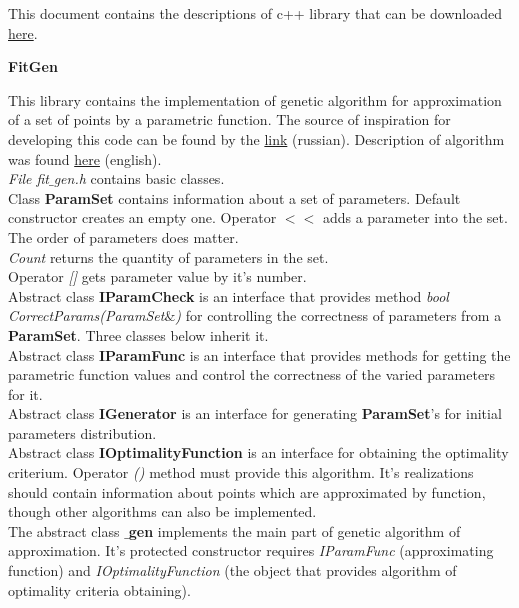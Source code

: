 \documentclass[a4paper]{article}
\begin{document}
This document contains the descriptions of c++ library that can be downloaded
\href{https://github.com/alexkernphysiker/FitGen}{here}.
\\
\begin{center}\Large \textbf{FitGen}\end{center}
This library contains the implementation of genetic algorithm for approximation of a set of points by a parametric function. 
The source of inspiration for developing this code can be found by the \href{http://habrahabr.ru/post/171751/}{link} (russian). 
Description of algorithm was found \href{http://www.drdobbs.com/database/differential-evolution/184410166}{here} (english).
\\
\textit{\Large File fit$\_$gen.h} contains basic classes.
\\
Class \textbf{ParamSet} contains information about a set of parameters. 
Default constructor creates an empty one.
Operator \textit{$<<$} adds a parameter into the set. The order of parameters does matter.\\
\textit{Count} returns the quantity of parameters in the set.\\
Operator \textit{[]} gets parameter value by it's number.\\
Abstract class \textbf{IParamCheck} is an interface that provides method \textit{bool CorrectParams(ParamSet$\&$)} for controlling the correctness of parameters from a \textbf{ParamSet}.
Three classes below inherit it.
\\
Abstract class \textbf{IParamFunc} is an interface that provides methods for getting the parametric function values and control the correctness of the varied parameters for it.
\\
Abstract class \textbf{IGenerator} is an interface for generating \textbf{ParamSet}'s for initial parameters distribution.
\\
Abstract class \textbf{IOptimalityFunction} is an interface for obtaining the optimality criterium.
Operator \textit{()} method must provide this algorithm. 
It's realizations should contain information about points which are approximated by function, though other algorithms can also be implemented.
\\
The abstract class \textbf{$\_$gen} implements the main part of genetic algorithm of approximation.
It's protected constructor requires \textit{IParamFunc} (approximating function) and \textit{IOptimalityFunction} (the object that provides algorithm of optimality criteria obtaining).
\end{document}
